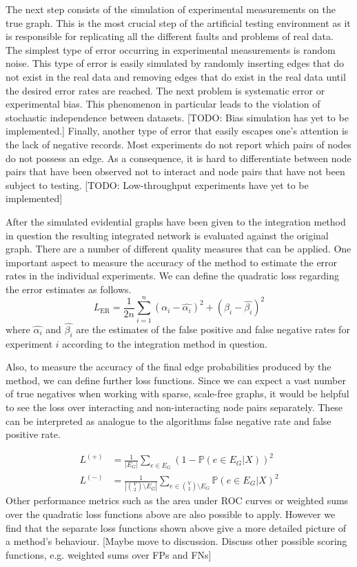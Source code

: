 \documentclass{bioinfo}
\newcommand{\prob}{\mathbb{P}}
\newcommand{\note}[1]{{\color{red}[#1]}}
\begin{document}
\begin{methods}
The next step consists of the simulation of experimental measurements on the true graph. This is the most crucial step of the artificial testing environment as it is responsible for replicating all the different faults and problems of real data. The simplest type of error occurring in experimental measurements is random noise. This type of error is easily simulated by randomly inserting edges that do not exist in the real data and removing edges that do exist in the real data until the desired error rates are reached. The next problem is systematic error or experimental bias. This phenomenon in particular leads to the violation of stochastic independence between datasets. 
\note{TODO: Bias simulation has yet to be implemented.}%
Finally, another type of error that easily escapes one's attention is the lack of negative records. Most experiments do not report which pairs of nodes do not possess an edge. As a consequence, it is hard to differentiate between node pairs that have been observed not to interact and node pairs that have not been subject to testing. 
\note{TODO: Low-throughput experiments have yet to be implemented}%

After the simulated evidential graphs have been given to the integration method in question the resulting integrated network is evaluated against the original graph. There are a number of different quality measures that can be applied. One important aspect to measure the accuracy of the method to estimate the error rates in the individual experiments. We can define the quadratic loss regarding the error estimates as follows.
\begin{equation}
  L_\text{ER} = \frac{1}{2n}\sum_{i=1}^n (\alpha_i - \hat{\alpha_i})^2 + (\beta_i - \hat{\beta_i})^2
\end{equation}
where $\hat{\alpha_i}$ and $\hat{\beta_i}$ are the estimates of the false positive and false negative rates for experiment $i$ according to the integration method in question.

Also, to measure the accuracy of the final edge probabilities produced by the method, we can define further loss functions. Since we can expect a vast number of true negatives when working with sparse, scale-free graphs, it would be helpful to see the loss over interacting and non-interacting node pairs separately. These can be interpreted as analogue to the algorithms false negative rate and false positive rate.

\begin{align} 
	L^{(+)} &= \frac{1}{|E_G|}\sum_{e \in E_G} (1 - \prob(e \in E_G|X))^2\\
	L^{(-)} &= \frac{1}{|\binom{V}{2} \setminus E_G|}\sum_{e \in \binom{V}{2} \setminus E_G} \prob(e \in E_G|X)^2
\end{align}
Other performance metrics such as the area under ROC curves or weighted sums over the quadratic loss functions above are also possible to apply. However we find that the separate loss functions shown above give a more detailed picture of a method's behaviour.
\note{Maybe move to discussion. Discuss other possible scoring functions, e.g. weighted sums over FPs and FNs}


\end{methods}
\end{document}
